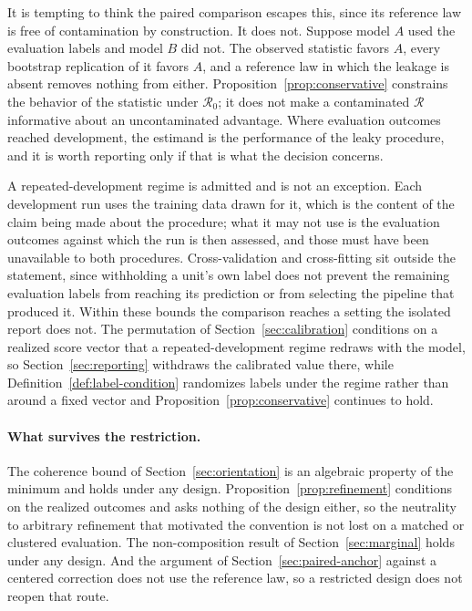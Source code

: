 \documentclass[11pt]{article}
\newcommand{\Regime}{\mathcal{R}}
\theoremstyle{remark}
\begin{document}
It is tempting to think the paired comparison escapes this, since its reference law is free of contamination by construction. It does not. Suppose model $A$ used the evaluation labels and model $B$ did not. The observed statistic favors $A$, every bootstrap replication of it favors $A$, and a reference law in which the leakage is absent removes nothing from either. Proposition~\ref{prop:conservative} constrains the behavior of the statistic under $\Regime_0$; it does not make a contaminated $\Regime$ informative about an uncontaminated advantage. Where evaluation outcomes reached development, the estimand is the performance of the leaky procedure, and it is worth reporting only if that is what the decision concerns.

A repeated-development regime is admitted and is not an exception. Each development run uses the training data drawn for it, which is the content of the claim being made about the procedure; what it may not use is the evaluation outcomes against which the run is then assessed, and those must have been unavailable to both procedures. Cross-validation and cross-fitting sit outside the statement, since withholding a unit's own label does not prevent the remaining evaluation labels from reaching its prediction or from selecting the pipeline that produced it. Within these bounds the comparison reaches a setting the isolated report does not. The permutation of Section~\ref{sec:calibration} conditions on a realized score vector that a repeated-development regime redraws with the model, so Section~\ref{sec:reporting} withdraws the calibrated value there, while Definition~\ref{def:label-condition} randomizes labels under the regime rather than around a fixed vector and Proposition~\ref{prop:conservative} continues to hold.

\paragraph{What survives the restriction.}
The coherence bound of Section~\ref{sec:orientation} is an algebraic property of the minimum and holds under any design. Proposition~\ref{prop:refinement} conditions on the realized outcomes and asks nothing of the design either, so the neutrality to arbitrary refinement that motivated the convention is not lost on a matched or clustered evaluation. The non-composition result of Section~\ref{sec:marginal} holds under any design. And the argument of Section~\ref{sec:paired-anchor} against a centered correction does not use the reference law, so a restricted design does not reopen that route.
\end{document}
